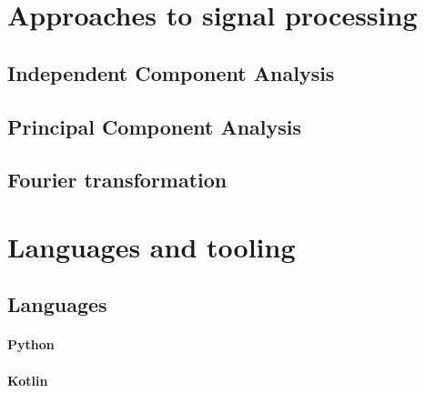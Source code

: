\section{Approaches to signal processing}

\subsection{Independent Component Analysis}
\subsection{Principal Component Analysis}
\subsection{Fourier transformation}



\section{Languages and tooling}
\subsection{Languages}
\paragraph{Python}
\paragraph{Kotlin}

